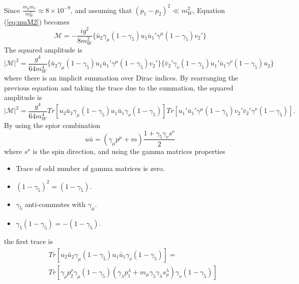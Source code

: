 \documentclass{outhesis}
\begin{document}
Since $\frac{m_{\mu}m_e}{m_W^2} \approx 8 \times 10^{-9}$, and assuming that $\left(p_1-p_2 \right)^2 \ll m_W^2$, Equation (\ref{eq:muM2}) becomes
\begin{equation}
\mathcal{M} = -\frac{ig^2}{8m_W^2} \{\bar{u}_2 \gamma_{\mu}\left(1-\gamma_5\right)u_1\bar{u}_1'\gamma^{\mu}\left(1-\gamma_5\right)v_2' \}
\label{eq:muM3}
\end{equation}
The squared amplitude is 
\begin{equation}
|\mathcal{M}|^2 = \frac{g^4}{64m_W^4} \{\bar{u}_2 \gamma_{\mu}\left(1-\gamma_5\right)u_1\bar{u}_1'\gamma^{\mu}\left(1-\gamma_5\right)v_2'\}
\{\bar{v}_2' \gamma_{\nu}\left(1-\gamma_5\right)u_1'\bar{u}_1\gamma^{\nu}\left(1-\gamma_5\right)u_2\}
\label{eq:MM}
\end{equation}
where there is an implicit summation over Dirac indices. By rearranging the previous equation and taking the trace due to the summation, the squared amplitude is
\begin{equation}
|\mathcal{M}|^2 = \frac{g^4}{64m_W^4} Tr[u_2\bar{u}_2 \gamma_{\mu}\left(1-\gamma_5\right)u_1\bar{u}_1\gamma_{\nu}\left(1-\gamma_5\right)]
Tr[u_1'\bar{u}_1'\gamma^{\mu}\left(1-\gamma_5\right)v_2'\bar{v}_2'\gamma^{\nu}\left(1-\gamma_5\right)].
\label{eq:MM}
\end{equation}
By using the spior combination 
\begin{equation}
u\bar{u} = \left( \gamma_{\mu}p^{\mu} + m \right)\frac{1+\gamma_5\gamma_{\nu}s^{\nu}}{2}
\end{equation}
where $s^{\nu}$ is the spin direction, and using the gamma matrices properties
\begin{itemize}
\item Trace of odd number of gamma matrices is zero.
\item $\left( 1-\gamma_5 \right)^2 = \left( 1-\gamma_5\right)$.
\item $\gamma_5$ anti-commutes with $\gamma_{\mu}$.
\item $\gamma_5\left(1-\gamma_5 \right) = -\left(1-\gamma_5 \right)$.
\end{itemize}
the first trace is
\begin{equation}
\begin{split}
&Tr[u_2\bar{u}_2 \gamma_{\mu}\left(1-\gamma_5\right)u_1\bar{u}_1\gamma_{\nu}\left(1-\gamma_5\right)] = \\
&Tr[\gamma_{\rho}p_2^{\rho}\gamma_{\mu}\left(1-\gamma_5\right)\left(\gamma_{\lambda}p_1^{\lambda} +m_{\mu}\gamma_5\gamma_{\lambda}s_{\mu}^{\lambda} \right)\gamma_{\nu}\left(1-\gamma_5\right)] \\
\end{split}
\end{equation}
\end{document}
